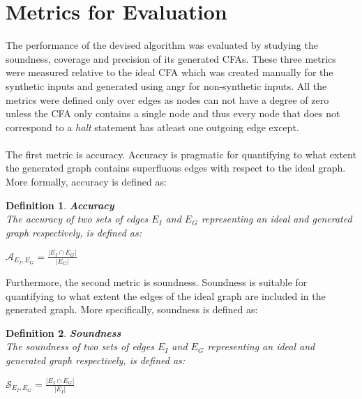 \documentclass{kththesis}
\newtheorem*{definition}{Definition}
\newcommand{\fbcomment}[1]{{#1}}
\renewcommand{\fbcomment}[1]{}
\renewcommand{\it}[1]{\textit{#1}}
\begin{document}
\section{Metrics for Evaluation}\label{sec:metrics}
\fbcomment{\color{red}Goal: Introduce the metrics that will be used in the result chapter. Was put in the end of the method chapter since it is only relevant for the result chapter(The notions are introduced in the background chapter but not given formal definitions until now).}
The performance of the devised algorithm was evaluated by studying the soundness, coverage and precision of its generated CFAs. These three metrics were measured relative to the ideal CFA which was created manually for the synthetic inputs and generated using angr for non-synthetic inputs. All the metrics were defined only over edges as nodes can not have a degree of zero unless the CFA only contains a single node and thus every node that does not correspond to a \it{halt} statement has atleast one outgoing edge except.
\\ \\
The first metric is accuracy. Accuracy is pragmatic for quantifying to what extent the generated graph contains superfluous edges with respect to the ideal graph. More formally, accuracy is defined as:
\begin{definition} \textbf{Accuracy}\\
The accuracy of two sets of edges $E_I$ and $E_G$ representing an ideal and generated graph respectively, is defined as:
\begin{center}
$\mathcal{A}_{E_I,E_G} = \frac{|E_I \cap E_G|}{|E_G|}$    
\end{center}
\end{definition}
\noindent
Furthermore, the second metric is soundness. Soundness is suitable for quantifying to what extent the edges of the ideal graph are included in the generated graph. More specifically, soundness is defined as:
\begin{definition} \textbf{Soundness}\\
The soundness of two sets of edges $E_I$ and $E_G$ representing an ideal and generated graph respectively, is defined as:
\begin{center}
$\mathcal{S}_{E_I,E_G} = \frac{|E_I \cap E_G|}{|E_I|}$    
\end{center}
\end{definition}
\noindent
\end{document}
